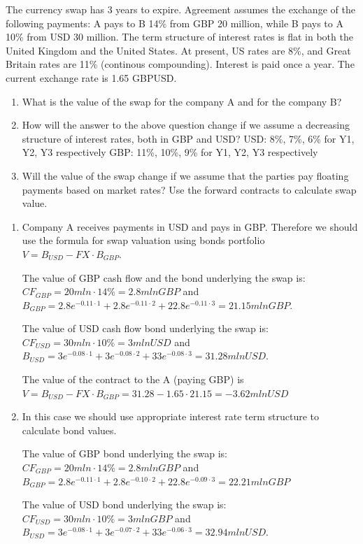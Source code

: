 \documentclass[12pt,a4paper]{exam}
\begin{document}
\begin{questions}
\question The currency swap has 3 years to expire. Agreement assumes the exchange of the following payments: A pays to B 14\% from GBP 20 million, while B pays to A 10\% from USD 30 million. The term structure of interest rates is flat in both the United Kingdom and the United States. At present, US rates are 8\%, and Great Britain rates are 11\% (continous compounding). Interest is paid once a year. The current exchange rate is 1.65 GBPUSD.
\begin{enumerate}[label=(\alph*),font=\itshape]
\item What is the value of the swap for the company A and for the company B?
\item How will the answer to the above question change if we assume a decreasing structure of interest rates, both in GBP and USD?
USD: 8\%, 7\%, 6\% for Y1, Y2, Y3 respectively
GBP: 11\%, 10\%, 9\% for Y1, Y2, Y3 respectively
\item Will the value of the swap change if we assume that the parties pay floating payments based on market rates? Use the forward contracts to calculate swap value.
\end{enumerate}
\begin{solution}
\begin{enumerate}[label=(\alph*),font=\itshape]
\item Company A receives payments in USD and pays in GBP. Therefore we should use the formula for swap valuation using bonds portfolio $V= B_{USD}-FX\cdot B_{GBP}$.

The value of GBP cash flow and the bond underlying the swap is:
$C F_{GBP}=20 mln\cdot 14\%=2.8 mln GBP$ and $B_{GBP}=2.8e^{-0.11\cdot1}+2.8e^{-0.11\cdot2}+22.8e^{-0.11\cdot 3}=21.15 mln GBP$.

The value of USD cash flow bond underlying the swap is:
$CF_{USD}=30 mln\cdot10\%=3 mln USD$ and $B_{USD}=3e^{-0.08\cdot1}+3e^{-0.08\cdot2}+33e^{-0.08\cdot3}=31.28 mln USD$.

The value of the contract to the A (paying GBP) is
$V=B_{USD}-FX\cdot B_{GBP}=31.28-1.65\cdot21.15=-3.62 mln USD$
\item In this case we should use appropriate interest rate term structure to calculate bond values.

The value of GBP bond underlying the swap is: $CF_{GBP}=20 mln\cdot14\%=2.8 mln GBP$ and $B_{GBP}=2.8e^{-0.11\cdot1}+2.8e^{-0.10\cdot 2}+22.8e^{-0.09\cdot3}=22.21 mln GBP$

The value of USD bond underlying the swap is: $CF_{USD}=30 mln\cdot 10\%=3 mln GBP$ and $B_{USD}=3e^{-0.08\cdot1}+3e^{-0.07\cdot2}+33e^{-0.06\cdot3}=32.94 mln USD$.


\end{enumerate}
\end{solution}
\end{questions}
\end{document}
